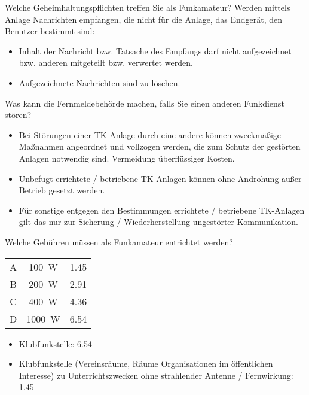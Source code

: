 \documentclass[avery5371,grid,frame,a4paper]{flashcards}
\newcommand{\card}[3]{
  \begin{flashcard}[{\chap} -- #1]{#2}#3\end{flashcard}
}
\begin{document}
\card{14}{Welche Geheimhaltungspflichten treffen Sie als Funkamateur?}{
  Werden mittels Anlage Nachrichten empfangen, die nicht für die Anlage, das Endgerät, den Benutzer bestimmt sind:

  \begin{itemize}
    \item Inhalt der Nachricht bzw. Tatsache des Empfangs darf nicht aufgezeichnet bzw. anderen mitgeteilt bzw. verwertet werden.
    \item Aufgezeichnete Nachrichten sind zu löschen.
  \end{itemize}
}

\card{16}{Was kann die Fernmeldebehörde machen, falls Sie einen anderen Funkdienst stören?}{
  \small
  \begin{itemize}
    \item Bei Störungen einer TK-Anlage durch eine andere können zweckmäßige Maßnahmen angeordnet und vollzogen werden, die zum Schutz der gestörten Anlagen notwendig sind. Vermeidung überflüssiger Kosten.
    \item Unbefugt errichtete / betriebene TK-Anlagen können ohne Androhung außer Betrieb gesetzt werden.
    \item Für sonstige entgegen den Bestimmungen errichtete / betriebene TK-Anlagen gilt das nur zur Sicherung / Wiederherstellung ungestörter Kommunikation.
  \end{itemize}
}

\card{17}{Welche Gebühren müssen als Funkamateur entrichtet werden?}{
  \begin{center}
    \begin{tabular}{ccc}
      A & \SI{100}{\watt} & \SI{1,45}{\EUR} \\
      B & \SI{200}{\watt} & \SI{2,91}{\EUR} \\
      C & \SI{400}{\watt} & \SI{4,36}{\EUR} \\
      D & \SI{1000}{\watt} & \SI{6,54}{\EUR}
    \end{tabular}
  \end{center}
  \begin{itemize}
    \item Klubfunkstelle: \SI{6,54}{\EUR}
    \item Klubfunkstelle (Vereinsräume, Räume Organisationen im öffentlichen Interesse) zu Unterrichtszwecken ohne strahlender Antenne / Fernwirkung: \SI{1,45}{\EUR}
  \end{itemize}
}
\end{document}
